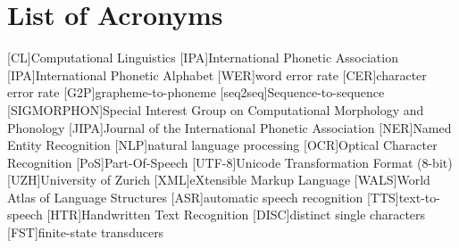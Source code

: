 {}
\chapter*{List of Acronyms}
\begin{acronym}[WER]\itemsep3pt
[CL]{Computational Linguistics}
[IPA]{International Phonetic Association}
[IPA]{International Phonetic Alphabet}
[WER]{word error rate}
[CER]{character error rate}
[G2P]{grapheme-to-phoneme} 
[seq2seq]{Sequence-to-sequence} 
[SIGMORPHON]{Special Interest Group on Computational  Morphology and Phonology}
[JIPA]{Journal of the International Phonetic Association}
[NER]{Named Entity Recognition}
[NLP]{natural language processing}
[OCR]{Optical Character Recognition}
[PoS]{Part-Of-Speech}
[UTF-8]{Unicode Transformation Format (8-bit)}
[UZH]{University of Zurich}
[XML]{eXtensible Markup Language}
[WALS]{World Atlas of Language Structures}
[ASR]{automatic speech recognition}
[TTS]{text-to-speech}
[HTR]{Handwritten Text Recognition}
[DISC]{distinct single characters}
[FST]{finite-state transducers}
\end{acronym}